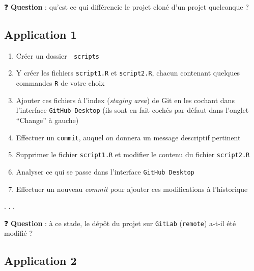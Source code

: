 \documentclass[
  letterpaper,
  DIV=11,
  numbers=noendperiod]{scrartcl}
\providecommand{\tightlist}{%
  \setlength{\itemsep}{0pt}\setlength{\parskip}{0pt}}\usepackage{longtable,booktabs,array}
\begin{document}
❓ \textbf{Question} : qu'est ce qui différencie le projet cloné d'un
projet quelconque ?

\hypertarget{application-1}{%
\subsection{Application 1}\label{application-1}}

\begin{tcolorbox}[enhanced jigsaw, colframe=quarto-callout-tip-color-frame, rightrule=.15mm, breakable, colbacktitle=quarto-callout-tip-color!10!white, coltitle=black, toptitle=1mm, title={Premiers commits}, titlerule=0mm, leftrule=.75mm, colback=white, bottomrule=.15mm, bottomtitle=1mm, toprule=.15mm, opacitybacktitle=0.6, arc=.35mm, left=2mm, opacityback=0]

\begin{enumerate}
\def\labelenumi{\arabic{enumi}.}
\tightlist
\item
  Créer un dossier 📁 \texttt{scripts}
\item
  Y créer les fichiers \texttt{script1.R} et \texttt{script2.R}, chacun
  contenant quelques commandes \texttt{R} de votre choix
\item
  Ajouter ces fichiers à l'index (\emph{staging area}) de Git en les
  cochant dans l'interface \texttt{GitHub\ Desktop} (ils sont en fait
  cochés par défaut dans l'onglet ``Change'' à gauche)
\item
  Effectuer un \texttt{commit}, auquel on donnera un message descriptif
  pertinent
\item
  Supprimer le fichier \texttt{script1.R} et modifier le contenu du
  fichier \texttt{script2.R}
\item
  Analyser ce qui se passe dans l'interface \texttt{GitHub\ Desktop}
\item
  Effectuer un nouveau \emph{commit} pour ajouter ces modifications à
  l'historique
\end{enumerate}

\end{tcolorbox}

. . .

❓ \textbf{Question} : à ce stade, le dépôt du projet sur
\texttt{GitLab} (\texttt{remote}) a-t-il été modifié ?

\hypertarget{application-2}{%
\subsection{Application 2}\label{application-2}}
\end{document}
